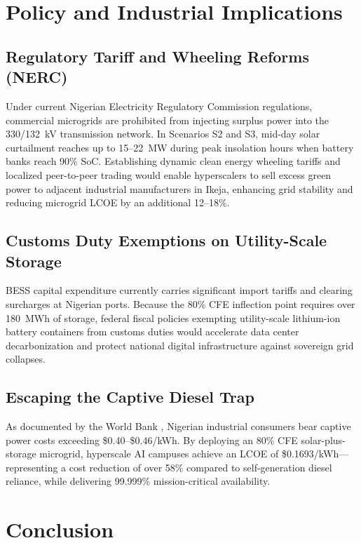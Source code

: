 \documentclass[12pt,3p,review]{elsarticle}
\begin{document}
\section{Policy and Industrial Implications}
\label{sec:policy}

\subsection{Regulatory Tariff and Wheeling Reforms (NERC)}
Under current Nigerian Electricity Regulatory Commission regulations, commercial microgrids are prohibited from injecting surplus power into the 330/132~kV transmission network. In Scenarios S2 and S3, mid-day solar curtailment reaches up to 15--22~MW during peak insolation hours when battery banks reach 90\% SoC. Establishing dynamic clean energy wheeling tariffs and localized peer-to-peer trading would enable hyperscalers to sell excess green power to adjacent industrial manufacturers in Ikeja, enhancing grid stability and reducing microgrid LCOE by an additional 12--18\%.

\subsection{Customs Duty Exemptions on Utility-Scale Storage}
BESS capital expenditure currently carries significant import tariffs and clearing surcharges at Nigerian ports. Because the 80\% CFE inflection point requires over 180~MWh of storage, federal fiscal policies exempting utility-scale lithium-ion battery containers from customs duties would accelerate data center decarbonization and protect national digital infrastructure against sovereign grid collapses.

\subsection{Escaping the Captive Diesel Trap}
As documented by the World Bank \cite{WorldBank2020}, Nigerian industrial consumers bear captive power costs exceeding \$0.40--\$0.46/kWh. By deploying an 80\% CFE solar-plus-storage microgrid, hyperscale AI campuses achieve an LCOE of \$0.1693/kWh—representing a cost reduction of over 58\% compared to self-generation diesel reliance, while delivering 99.999\% mission-critical availability.

\section{Conclusion}
\label{sec:concl}
\end{document}

